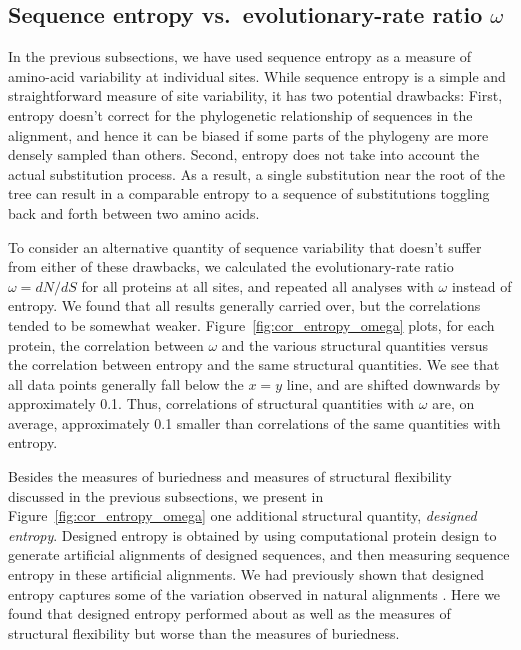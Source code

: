 \documentclass[12pt]{article}
\begin{document}
\subsection*{Sequence entropy vs.\ evolutionary-rate ratio $\omega$}

In the previous subsections, we have used sequence entropy as a measure of amino-acid variability at individual sites. While sequence entropy is a simple and straightforward measure of site variability, it has two potential drawbacks: First, entropy doesn't correct for the phylogenetic relationship of sequences in the alignment, and hence it can be biased if some parts of the phylogeny are more densely sampled than others. Second, entropy does not take into account the actual substitution process. As a result, a single substitution near the root of the tree can result in a comparable entropy to a sequence of substitutions toggling back and forth between two amino acids.

To consider an alternative quantity of sequence variability that doesn't suffer from either of these drawbacks, we calculated the evolutionary-rate ratio $\omega=dN/dS$ for all proteins at all sites, and repeated all analyses with $\omega$ instead of entropy. We found that all results generally carried over, but the correlations tended to be somewhat weaker. Figure~\ref{fig:cor_entropy_omega} plots, for each protein, the correlation between $\omega$ and the various structural quantities versus the correlation between entropy and the same structural quantities. We see that all data points generally fall below the $x=y$ line, and are shifted downwards by approximately 0.1. Thus, correlations of structural quantities with $\omega$ are, on average, approximately 0.1 smaller than correlations of the same quantities with entropy.

Besides the measures of buriedness and measures of structural flexibility discussed in the previous subsections, we present in  Figure~\ref{fig:cor_entropy_omega} one additional structural quantity, \emph{designed entropy}. Designed entropy is obtained by using computational protein design to generate artificial alignments of designed sequences, and then measuring sequence entropy in these artificial alignments. We had previously shown that designed entropy captures some of the variation observed in natural alignments \citep{Jacksonetal2013}. Here we found that designed entropy performed about as well as the measures of structural flexibility but worse than the measures of buriedness.
\end{document}
